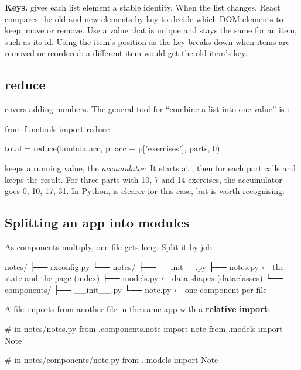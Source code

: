 \textbf{Keys.}  gives each list element a stable identity. When the list changes, React compares the old and new elements by key to decide which DOM elements to keep, move or remove. Use a value that is unique and stays the same for an item, such as its id. Using the item's position as the key breaks down when items are removed or reordered: a different item would get the old item's key.

\subsection{reduce}

 covers adding numbers. The general tool for ``combine a list into one value'' is :

\begin{py}
from functools import reduce

total = reduce(lambda acc, p: acc + p["exercises"], parts, 0)
\end{py}

 keeps a running value, the \emph{accumulator}. It starts at , then for each part calls  and keeps the result. For three parts with 10, 7 and 14 exercises, the accumulator goes 0, 10, 17, 31. In Python,  is clearer for this case, but  is worth recognising.

\subsection{Splitting an app into modules}

As components multiply, one file gets long. Split it by job:

\begin{code}
notes/
├── rxconfig.py
└── notes/
    ├── __init__.py
    ├── notes.py            ← the state and the page (index)
    ├── models.py           ← data shapes (dataclasses)
    └── components/
        ├── __init__.py
        └── note.py         ← one component per file
\end{code}

A file imports from another file in the same app with a \textbf{relative import}:

\begin{py}
# in notes/notes.py
from .components.note import note
from .models import Note

# in notes/components/note.py
from ..models import Note
\end{py}

